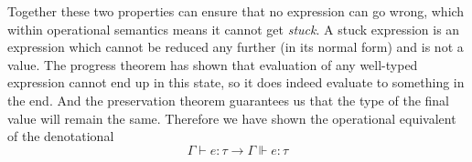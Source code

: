 Together these two properties can ensure that no expression can go
wrong, which within operational semantics means it cannot get
\textit{stuck}. A stuck expression is an expression which cannot be
reduced any further (in its normal form) and is not a
value. The progress theorem has shown that evaluation of any
well-typed expression cannot end up in this state, so it does indeed
evaluate to something in the end. And the preservation theorem
guarantees us that the type of the final value will remain the same.
Therefore we have shown the operational equivalent of the denotational
\[ \Gamma \vdash e : \tau \rightarrow \Gamma \Vdash e : \tau \]

